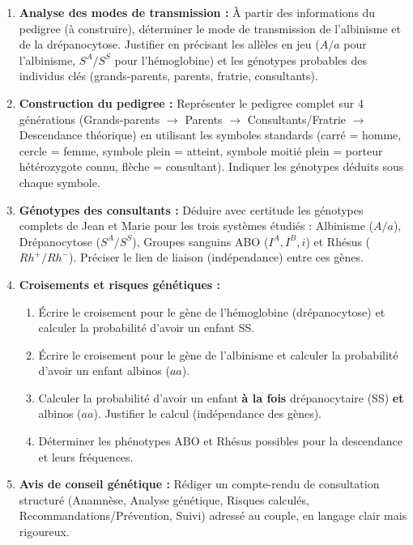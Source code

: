 \documentclass[11pt]{article}
\newcounter{popsec}
\newcounter{popsub}
\newcommand{\courssub}[1]{%
  \stepcounter{popsub}%
  \par\vspace{9pt}\noindent{\popxbold\fontsize{11.5}{13}\selectfont\color{popink}{\color{poporange}\thepopsec.\thepopsub}\hspace{6pt}#1}\par\nopagebreak\vspace{4pt}
}
\begin{document}
\courssub{Consignes}
\begin{enumerate}
    \item \textbf{Analyse des modes de transmission :} À partir des informations du pedigree (à construire), déterminer le mode de transmission de l'albinisme et de la drépanocytose. Justifier en précisant les allèles en jeu ($A/a$ pour l'albinisme, $S^A/S^S$ pour l'hémoglobine) et les génotypes probables des individus clés (grands-parents, parents, fratrie, consultants).
    \item \textbf{Construction du pedigree :} Représenter le pedigree complet sur 4 générations (Grands-parents $\to$ Parents $\to$ Consultants/Fratrie $\to$ Descendance théorique) en utilisant les symboles standards (carré = homme, cercle = femme, symbole plein = atteint, symbole moitié plein = porteur hétérozygote connu, flèche = consultant). Indiquer les génotypes déduits sous chaque symbole.
    \item \textbf{Génotypes des consultants :} Déduire avec certitude les génotypes complets de Jean et Marie pour les trois systèmes étudiés : Albinisme ($A/a$), Drépanocytose ($S^A/S^S$), Groupes sanguins ABO ($I^A, I^B, i$) et Rhésus ($Rh^+/Rh^-$). Préciser le lien de liaison (indépendance) entre ces gènes.
    \item \textbf{Croisements et risques génétiques :} 
    \begin{enumerate}
        \item Écrire le croisement pour le gène de l'hémoglobine (drépanocytose) et calculer la probabilité d'avoir un enfant SS.
        \item Écrire le croisement pour le gène de l'albinisme et calculer la probabilité d'avoir un enfant albinos ($aa$).
        \item Calculer la probabilité d'avoir un enfant \textbf{à la fois} drépanocytaire (SS) \textbf{et} albinos ($aa$). Justifier le calcul (indépendance des gènes).
        \item Déterminer les phénotypes ABO et Rhésus possibles pour la descendance et leurs fréquences.
    \end{enumerate}
    \item \textbf{Avis de conseil génétique :} Rédiger un compte-rendu de consultation structuré (Anamnèse, Analyse génétique, Risques calculés, Recommandations/Prévention, Suivi) adressé au couple, en langage clair mais rigoureux.
\end{enumerate}
\end{document}
